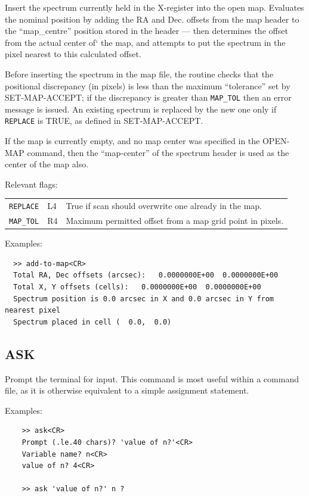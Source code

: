 \documentclass[11pt,twoside]{report}
\begin{document}
Insert the spectrum currently held in the X-register into the open map.
Evaluates the nominal position by adding the RA and Dec. offsets from the
map header to the ``map\_centre'' position stored in the header --- then
determines the offset from the actual center of` the map, and attempts to
put the spectrum in the pixel nearest to this calculated offset.

Before inserting the spectrum in the map file, the routine checks that the
positional discrepancy (in pixels) is less than the maximum ``tolerance''
set by SET-MAP-ACCEPT; if the discrepancy is greater than \verb+MAP_TOL+
then an error message is issued. An existing spectrum is replaced by the
new one only if \verb+REPLACE+ is TRUE, as defined in SET-MAP-ACCEPT.

If the map is currently empty, and no map center was specified in the
OPEN-MAP command, then the ``map-center'' of the spectrum header is used
as the center of the map also.

Relevant flags:\\
\begin{tabular}{lll}\index{REPLACE@\verb+REPLACE+}\index{MAP_TOL@\verb+MAP_TOL+}
  \verb+REPLACE+ &  L4 & True if scan should overwrite one already in
                            the map. \\
  \verb+MAP_TOL+ &  R4 & Maximum permitted offset from a map grid point
                            in pixels.
\end{tabular}

Examples:
\begin{verbatim}
  >> add-to-map<CR>
  Total RA, Dec offsets (arcsec):   0.0000000E+00  0.0000000E+00
  Total X, Y offsets (cells):   0.0000000E+00  0.0000000E+00
  Spectrum position is 0.0 arcsec in X and 0.0 arcsec in Y from nearest pixel
  Spectrum placed in cell (  0.0,  0.0)

\end{verbatim}

\subsection{ASK}  

Prompt the terminal for input. This command is most useful within a command
file, as it is otherwise equivalent to a simple assignment statement.

Examples:
\begin{verbatim}
    >> ask<CR>
    Prompt (.le.40 chars)? 'value of n?'<CR>
    Variable name? n<CR>
    value of n? 4<CR>

    >> ask 'value of n?' n ?
\end{verbatim}
\end{document}
